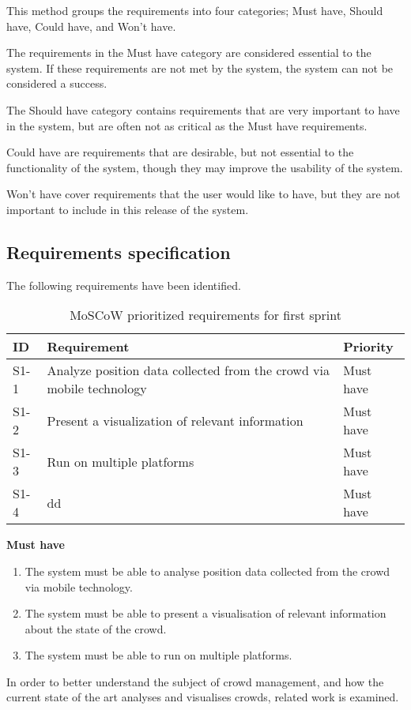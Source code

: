 This method groups the requirements into four categories; Must have, Should have, Could have, and Won't have. 

The requirements in the Must have category are considered essential to the system. If these requirements are not met by the system, the system can not be considered a success. 

The Should have category contains requirements that are very important to have in the system, but are often not as critical as the Must have requirements. 

Could have are requirements that are desirable, but not essential to the functionality of the system, though they may improve the usability of the system. 

Won't have cover requirements that the user would like to have, but they are not important to include in this release of the system.

\subsection{Requirements specification}

The following requirements have been identified.

\begin{table}[h!]
	\centering
	\begin{tabularx}{\textwidth}{lXl}
		\toprule
		\textbf{ID} & \textbf{Requirement} & \textbf{Priority} \\
		\midrule 
		\rowcolor[HTML]{EFEFEF} 
		S1-1  & Analyze position data collected from the crowd via mobile technology    & Must have \\
		S1-2  & Present a visualization of relevant information                         & Must have \\
		\rowcolor[HTML]{EFEFEF} 
		S1-3  & Run on multiple platforms                                               & Must have \\
		S1-4  & dd                                                                      & Must have \\
		\bottomrule
	\end{tabularx}
	\caption{MoSCoW prioritized requirements for first sprint}
	\label{tab:s1_req}
\end{table}


\textbf{Must have}
\begin{enumerate}
    \item The system must be able to analyse position data collected from the crowd via mobile technology.
    \item The system must be able to present a visualisation of relevant information about the state of the crowd.
    \item The system must be able to run on multiple platforms.
\end{enumerate}

In order to better understand the subject of crowd management, and how the current state of the art analyses and visualises crowds, related work is examined.

